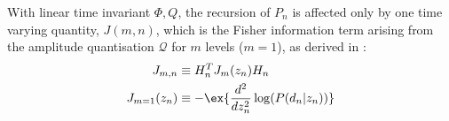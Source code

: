 With linear time invariant $\Phi, Q$, the recursion of $P_n$ is affected only by one time varying quantity, $J(m,n)$, which is the Fisher information term arising from the amplitude quantisation $\mathcal{Q}$ for $m$ levels ($m=1$), as derived in \cite{karlsson2005}: 
\begin{align}
J_{m, n} &\equiv H_n^T J_{m} (z_n) H_n \\
J_{m=1} (z_n) & \equiv -\ex{ \frac{d^2}{dz_n^2} \log(P(d_n | z_n))}
\end{align}

